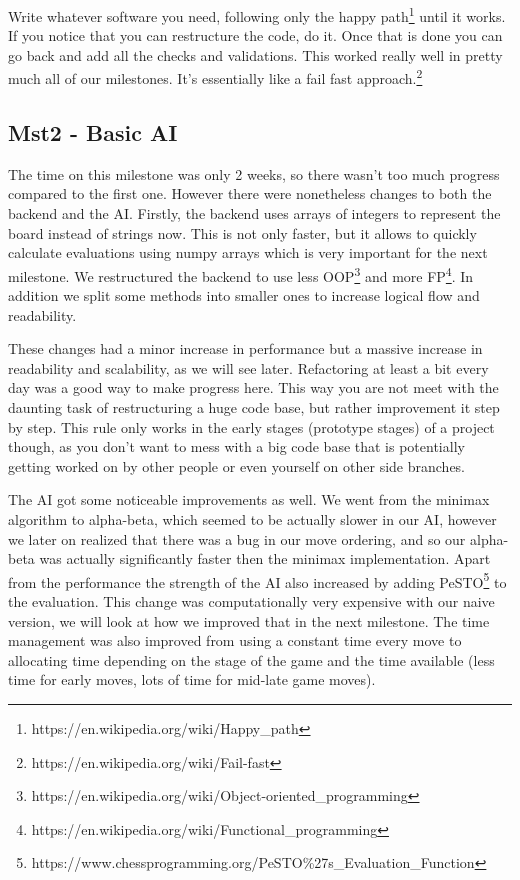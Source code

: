Write whatever software you need, following only the happy
path\footnote{https://en.wikipedia.org/wiki/Happy\_path}
until it works. If you notice that you can restructure the code,
do it. Once that is done you can go back and add all the
checks and validations.
This worked really well in pretty much all of our milestones.
It's essentially like a fail fast
approach.\footnote{https://en.wikipedia.org/wiki/Fail-fast}

\pagebreak

\subsection{Mst2 - Basic AI}

The time on this milestone was only 2 weeks, so there wasn't too much
progress compared to the first one.
However there were nonetheless changes to both the backend and the AI.
Firstly, the backend uses arrays of integers to represent
the board instead of strings now. This is not only faster,
but it allows to quickly calculate evaluations using numpy arrays
which is very important for the next milestone.
We restructured the backend to use less
OOP\footnote{https://en.wikipedia.org/wiki/Object-oriented\_programming}
and more
FP\footnote{https://en.wikipedia.org/wiki/Functional\_programming}.
In addition we split some methods into smaller ones to increase
logical flow and readability.

These changes had a minor increase in performance but a massive
increase in readability and scalability, as we will see later.
Refactoring at least a bit every day was a good way to make
progress here. This way you are not meet with the daunting
task of restructuring a huge code base, but rather improvement
it step by step.
This rule only works in the early stages (prototype stages) of a
project though, as you don't want to mess with a big code base
that is potentially getting worked on by other people or even
yourself on other side branches.

The AI got some noticeable improvements as well.
We went from the minimax algorithm to alpha-beta,
which seemed to be actually slower in our AI,
however we later on realized that there was a bug in
our move ordering, and so our alpha-beta was
actually significantly faster then the minimax
implementation.
Apart from the performance the strength of the AI
also increased by adding
PeSTO\footnote{https://www.chessprogramming.org/PeSTO\%27s\_Evaluation\_Function}
to the evaluation. This change was computationally very
expensive with our naive version, we will look at how we
improved that in the next milestone.
The time management was also improved from using
a constant time every move to allocating time
depending on the stage of the game and the time available
(less time for early moves, lots of time for mid-late game moves).

